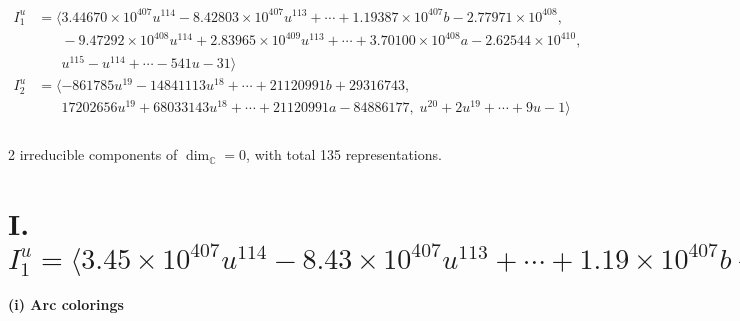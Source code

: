 \documentclass[1p]{elsarticle_modified}
\theoremstyle{definition}
\begin{document}
\begin{align*}
I^u_{1}&=\langle 
3.44670\times10^{407} u^{114}-8.42803\times10^{407} u^{113}+\cdots+1.19387\times10^{407} b-2.77971\times10^{408},\\
\phantom{I^u_{1}}&\phantom{= \langle  }-9.47292\times10^{408} u^{114}+2.83965\times10^{409} u^{113}+\cdots+3.70100\times10^{408} a-2.62544\times10^{410},\\
\phantom{I^u_{1}}&\phantom{= \langle  }u^{115}- u^{114}+\cdots-541 u-31\rangle \\
I^u_{2}&=\langle 
-861785 u^{19}-14841113 u^{18}+\cdots+21120991 b+29316743,\\
\phantom{I^u_{2}}&\phantom{= \langle  }17202656 u^{19}+68033143 u^{18}+\cdots+21120991 a-84886177,\;u^{20}+2 u^{19}+\cdots+9 u-1\rangle \\
\\
\end{align*}
\raggedright * 2 irreducible components of $\dim_{\mathbb{C}}=0$, with total 135 representations.\\
\newpage
\renewcommand{\arraystretch}{1}
\centering \section*{I. $I^u_{1}= \langle 3.45\times10^{407} u^{114}-8.43\times10^{407} u^{113}+\cdots+1.19\times10^{407} b-2.78\times10^{408},\;-9.47\times10^{408} u^{114}+2.84\times10^{409} u^{113}+\cdots+3.70\times10^{408} a-2.63\times10^{410},\;u^{115}- u^{114}+\cdots-541 u-31 \rangle$}
\flushleft \textbf{(i) Arc colorings}\\
\end{document}
